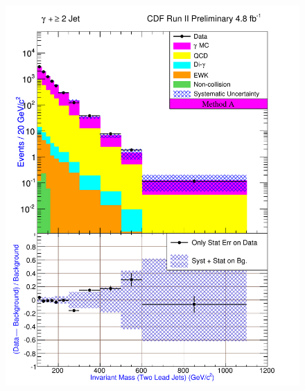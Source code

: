 \documentclass[12pt,twoside,letterpaper,doublespace]{article}
\begin{document}
\begin{figure}[h!]
{\includegraphics[keepaspectratio=true, scale=\figScale]{G30Jets_MtdA_plot2_InvMass_j1j2.pdf}}

\end{figure}
\end{document}
